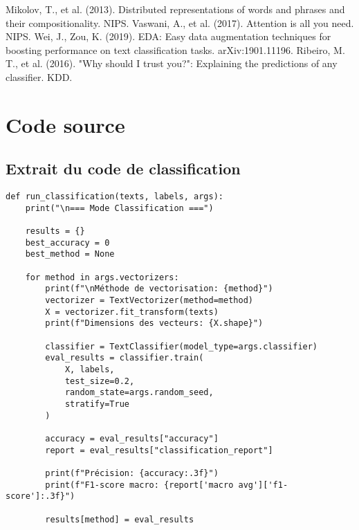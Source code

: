\documentclass[a4paper,11pt]{article}
\begin{document}

\begin{thebibliography}{9}
 Mikolov, T., et al. (2013). Distributed representations of words and phrases and their compositionality. NIPS.
 Vaswani, A., et al. (2017). Attention is all you need. NIPS.
 Wei, J., Zou, K. (2019). EDA: Easy data augmentation techniques for boosting performance on text classification tasks. arXiv:1901.11196.
 Ribeiro, M. T., et al. (2016). "Why should I trust you?": Explaining the predictions of any classifier. KDD.
\end{thebibliography}

\appendix
\section{Code source}
\label{app:code}

\subsection{Extrait du code de classification}
\begin{lstlisting}[caption=Implémentation du classificateur]
def run_classification(texts, labels, args):
    print("\n=== Mode Classification ===")
    
    results = {}
    best_accuracy = 0
    best_method = None
    
    for method in args.vectorizers:
        print(f"\nMéthode de vectorisation: {method}")
        vectorizer = TextVectorizer(method=method)
        X = vectorizer.fit_transform(texts)
        print(f"Dimensions des vecteurs: {X.shape}")
        
        classifier = TextClassifier(model_type=args.classifier)
        eval_results = classifier.train(
            X, labels, 
            test_size=0.2, 
            random_state=args.random_seed, 
            stratify=True
        )
        
        accuracy = eval_results["accuracy"]
        report = eval_results["classification_report"]
        
        print(f"Précision: {accuracy:.3f}")
        print(f"F1-score macro: {report['macro avg']['f1-score']:.3f}")
        
        results[method] = eval_results
\end{lstlisting}
\end{document}
